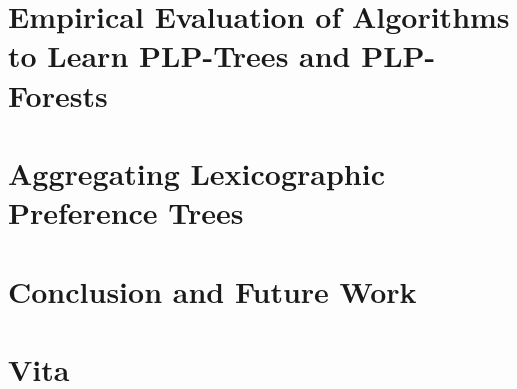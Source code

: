\documentclass[final]{ukthesis}
\begin{document}
\chapter{Empirical Evaluation of Algorithms to Learn PLP-Trees and PLP-Forests\label{ch:PLPTF}}

\copyrightnotice

\chapter{Aggregating Lexicographic Preference Trees\label{ch:aggLP}}

\copyrightnotice

%

\chapter{Conclusion and Future Work\label{ch:summary}}

\copyrightnotice


\backmatter



\chapter{Vita}

\copyrightnotice
\end{document}
